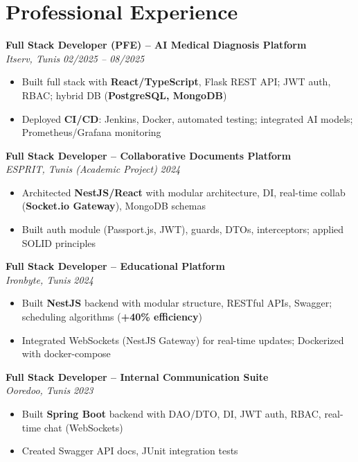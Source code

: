 \documentclass[10pt,a4paper]{article}
\begin{document}
\section*{Professional Experience}
{\small

\textbf{Full Stack Developer (PFE) -- AI Medical Diagnosis Platform}\\[1pt]
\textit{Itserv, Tunis} \hfill \textit{02/2025 -- 08/2025}
\begin{itemize}[leftmargin=12pt,itemsep=2pt,topsep=3pt,parsep=0pt]
  \item Built full stack with \textbf{React/TypeScript}, Flask REST API; JWT auth, RBAC; hybrid DB (\textbf{PostgreSQL, MongoDB})
  \item Deployed \textbf{CI/CD}: Jenkins, Docker, automated testing; integrated AI models; Prometheus/Grafana monitoring
\end{itemize}

\vspace{3pt}
\textbf{Full Stack Developer -- Collaborative Documents Platform}\\[1pt]
\textit{ESPRIT, Tunis (Academic Project)} \hfill \textit{2024}
\begin{itemize}[leftmargin=12pt,itemsep=2pt,topsep=3pt,parsep=0pt]
  \item Architected \textbf{NestJS/React} with modular architecture, DI, real-time collab (\textbf{Socket.io Gateway}), MongoDB schemas
  \item Built auth module (Passport.js, JWT), guards, DTOs, interceptors; applied SOLID principles
\end{itemize}

\vspace{3pt}
\textbf{Full Stack Developer -- Educational Platform}\\[1pt]
\textit{Ironbyte, Tunis} \hfill \textit{2024}
\begin{itemize}[leftmargin=12pt,itemsep=2pt,topsep=3pt,parsep=0pt]
  \item Built \textbf{NestJS} backend with modular structure, RESTful APIs, Swagger; scheduling algorithms (\textbf{+40\% efficiency})
  \item Integrated WebSockets (NestJS Gateway) for real-time updates; Dockerized with docker-compose
\end{itemize}

\vspace{3pt}
\textbf{Full Stack Developer -- Internal Communication Suite}\\[1pt]
\textit{Ooredoo, Tunis} \hfill \textit{2023}
\begin{itemize}[leftmargin=12pt,itemsep=2pt,topsep=3pt,parsep=0pt]
  \item Built \textbf{Spring Boot} backend with DAO/DTO, DI, JWT auth, RBAC, real-time chat (WebSockets)
  \item Created Swagger API docs, JUnit integration tests
\end{itemize}

}
\end{document}

